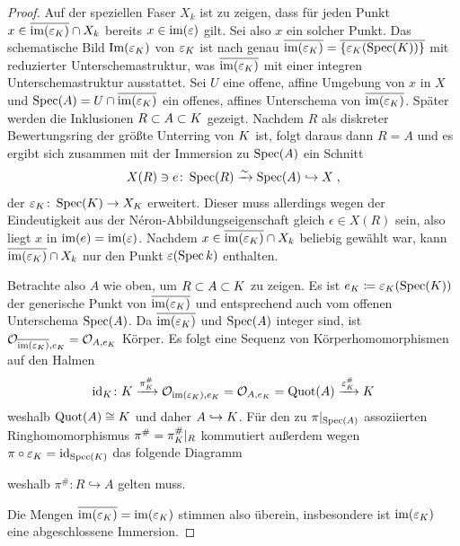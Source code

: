 \begin{Lemma}
\begin{proof}
    Auf der speziellen Faser $X_k$ ist zu zeigen, dass für jeden
    Punkt $x\in\overline{\operatorname{im}(\varepsilon_{K})}\cap X_k$ bereits
    $x\in\operatorname{im}(\varepsilon)$ gilt. Sei also $x$ ein solcher Punkt.
    Das schematische Bild $\text{Im}(\varepsilon_{K})$ von $\varepsilon_{K}$ ist
    nach \cite[Remark~10.32]{wedhorn} genau
    $\overline{\operatorname{im}(\varepsilon_{K})}=\overline{\{\varepsilon_{K}(\operatorname{Spec}(K))\}}$
    mit reduzierter Unterschemastruktur, was
    $\overline{\operatorname{im}(\varepsilon_{K})}$ mit einer integren
    Unterschemastruktur ausstattet.
    Sei $U$ eine offene, affine Umgebung von $x$ in $X$ und
    $\operatorname{Spec}(A)=U\cap\overline{\operatorname{im}(\varepsilon_{K})}$ ein offenes, affines
    Unterschema von $\overline{\operatorname{im}(\varepsilon_{K})}$.
    Später werden die Inklusionen $R\subset A\subset K$ gezeigt.
    Nachdem $R$ als diskreter Bewertungsring der größte Unterring
    von $K$ ist, folgt daraus dann $R=A$ und es ergibt sich zusammen
    mit der Immersion zu $\operatorname{Spec}(A)$ ein Schnitt
    \begin{gather*}
      X(R)\ni e\colon
      \operatorname{Spec}(R)\xrightarrow{\sim}\operatorname{Spec}(A)\hookrightarrow X\;,
    \end{gather*}
    der $\varepsilon_{K}\colon\operatorname{Spec}(K)\to X_{K}$ erweitert.
    Dieser muss allerdings wegen der Eindeutigkeit aus der Néron-Abbildungseigenschaft
    gleich $\epsilon\in X(R)$ sein, also liegt $x$ in
    $\operatorname{im}(e)=\operatorname{im}(\varepsilon)$.
    Nachdem $x\in \overline{\operatorname{im}(\varepsilon_{K})}\cap X_k$ beliebig
    gewählt war, kann $\overline{\operatorname{im}(\varepsilon_{K})}\cap X_k$ nur
    den Punkt $\varepsilon(\operatorname{Spec} k)$ enthalten.

    Betrachte also $A$ wie oben, um $R\subset A\subset K$ zu
    zeigen. Es ist $e_{K}\coloneqq\varepsilon_{K}(\operatorname{Spec}(K))$ der
    generische Punkt von $\overline{\operatorname{im}(\varepsilon_{K})}$ und
    entsprechend auch vom offenen Unterschema $\operatorname{Spec}(A)$. Da
    $\overline{\operatorname{im}(\varepsilon_{K})}$ und $\operatorname{Spec}(A)$ integer sind, ist
    $\mathcal{O}_{\overline{\text{im}(\varepsilon_{K})}, e_{K}}=\mathcal{O}_{A,e_{K}}$ Körper.
    Es folgt eine Sequenz von Körperhomomorphismen auf den Halmen
    \begin{gather*}
      \mathrm{id}_{K}\colon
      K \xrightarrow{\pi_{K}^\#}
      \mathcal{O}_{\text{im}(\varepsilon_{K}), e_{K}} = \mathcal{O}_{A,e_{K}} = \operatorname{Quot}(A)
      \xrightarrow{\varepsilon_{K}^\#} K
    \end{gather*}
    weshalb $\operatorname{Quot}(A)\cong K$ und daher $A\hookrightarrow K$.
    Für den zu $\pi|_{\operatorname{Spec}(A)}$ assoziierten
    Ringhomomorphismus $\pi^\#=\pi_{K}^\#|_R$ kommutiert außerdem wegen
    $\pi\circ\varepsilon_{K}=\mathrm{id}_{\operatorname{Spec}(K)}$ das folgende Diagramm
    \begin{center}
    \end{center}
    weshalb $\pi^\#\colon R\hookrightarrow A$ gelten muss.
    
    Die Mengen $\overline{\operatorname{im}(\varepsilon_{K})}=\operatorname{im}(\varepsilon_{K})$ stimmen
    also überein, insbesondere ist $\operatorname{im}(\varepsilon_{K})$ eine
    abgeschlossene Immersion.
  \end{proof}
\end{Lemma}

